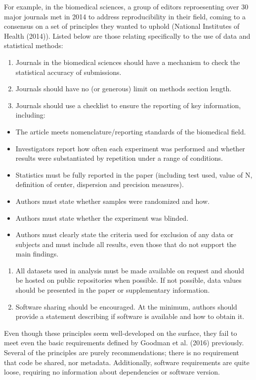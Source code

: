 \documentclass[12pt,twoside]{reedthesis}
\providecommand{\tightlist}{%
  \setlength{\itemsep}{0pt}\setlength{\parskip}{0pt}}
\begin{document}
For example, in the biomedical sciences, a group of editors
reproesenting over 30 major journals met in 2014 to address
reproducibility in their field, coming to a consensus on a set of
principles they wanted to uphold (National Institutes of Health (2014)).
Listed below are those relating specifically to the use of data and
statistical methods:
\begin{enumerate}
\def\labelenumi{\arabic{enumi})}
\item
  Journals in the biomedical sciences should have a mechanism to check
  the statistical accuracy of submissions.
\item
  Journals should have no (or generous) limit on methods section length.
\item
  Journals should use a checklist to ensure the reporting of key
  information, including:
\end{enumerate}
\begin{itemize}
\tightlist
\item
  The article meets nomenclature/reporting standards of the biomedical
  field.
\item
  Investigators report how often each experiment was performed and
  whether results were substantiated by repetition under a range of
  conditions.
\item
  Statistics must be fully reported in the paper (including test used,
  value of N, definition of center, dispersion and precision measures).
\item
  Authors must state whether samples were randomized and how.
\item
  Authors must state whether the experiment was blinded.
\item
  Authors must clearly state the criteria used for exclusion of any data
  or subjects and must include all results, even those that do not
  support the main findings.
\end{itemize}
\begin{enumerate}
\def\labelenumi{\arabic{enumi})}
\setcounter{enumi}{3}
\item
  All datasets used in analysis must be made available on request and
  should be hosted on public repositories when possible. If not
  possible, data values should be presented in the paper or
  supplementary information.
\item
  Software sharing should be encouraged. At the minimum, authors should
  provide a statement describing if software is available and how to
  obtain it.
\end{enumerate}
Even though these principles seem well-developed on the surface, they
fail to meet even the basic requirements defined by Goodman et al.
(2016) previously. Several of the principles are purely recommendations;
there is no requirement that code be shared, nor metadata. Additionally,
software requirements are quite loose, requiring no information about
dependencies or software version.
\end{document}
